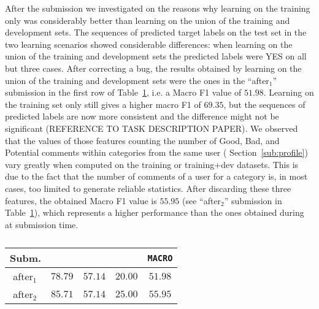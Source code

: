 After the submission we investigated on the reasons why learning on the training 
only was considerably better than learning on the union of the training and 
development sets. 
The sequences of predicted target labels on the test set in the two learning 
scenarios showed considerable differences: when learning on the union of the 
training and development sets the predicted labels were YES on all but three 
cases. 
After correcting a bug, the results obtained by learning on the union of the 
training and development sets were the ones in the ``after$_1$'' submission in 
the first row of Table~\ref{tab:aftertaskb}, i.e.  
a Macro F1 value of $51.98$. Learning on the training set only still gives a 
higher macro F1 of $69.35$, but the sequences of predicted labels are now more 
consistent and the difference might not be significant (REFERENCE TO TASK 
DESCRIPTION PAPER). 
We observed that the values of those features counting the number of Good, Bad, 
and Potential comments within categories from the same user (\cf 
Section~\ref{sub:profile}) vary greatly when computed on the training or 
training+dev datasets. 
This is due to the fact that the number of comments of a user for a category is, 
in most cases, too limited to generate reliable statistics. 
After discarding these three features, the obtained Macro F1 value is $55.95$ 
(see ``after$_2$'' submission in Table~\ref{tab:aftertaskb}), which represents a 
higher performance than the ones obtained during at submission time.

\begin{table}%
\begin{tabular}{|l|cccc|}
\hline  
 Subm.		& \bf \yes & \bf \no & \bf \unsure & \bf \texttt{MACRO}	 \\
  \hline
  \,\,after$_1$	& $78.79$	& $57.14$	& $20.00$	& $51.98$ \\
  \,\,after$_2$ & $85.71$	& $57.14$	& $25.00$ 	& $55.95$ \\
  \hline
 \end{tabular}
 \caption{\label{tab:aftertaskb}}
 \end{table}